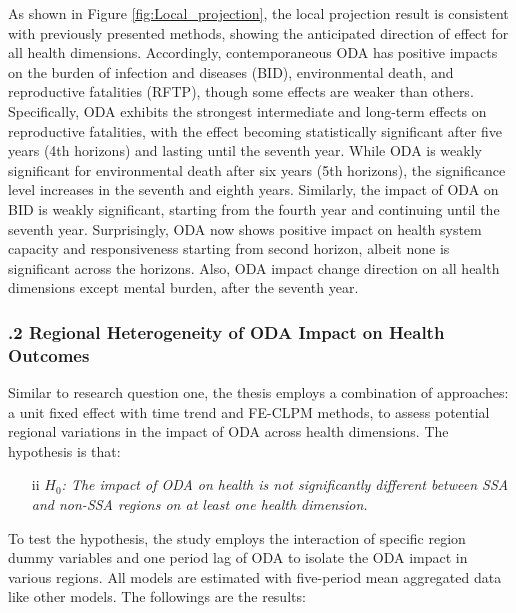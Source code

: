 As shown in Figure \ref{fig:Local_projection}, the local projection result is consistent with previously presented methods, showing the anticipated direction of effect for all health dimensions. Accordingly, contemporaneous ODA has positive impacts on the burden of infection and diseases (BID), environmental death, and reproductive fatalities (RFTP), though some effects are weaker than others. Specifically, ODA exhibits the strongest intermediate and long-term effects on reproductive fatalities, with the effect becoming statistically significant after five years (4th horizons) and lasting until the seventh year. While ODA is weakly significant for environmental death after six years (5th horizons), the significance level increases in the seventh and eighth years. Similarly, the impact of ODA on BID is weakly significant, starting from the fourth year and continuing until the seventh year. Surprisingly, ODA now shows positive impact on health system capacity and responsiveness starting from second horizon, albeit none is significant across the horizons. Also, ODA impact change direction on all health dimensions except mental burden, after the seventh year.    

\subsubsection*{.2 Regional Heterogeneity of ODA Impact on Health Outcomes}
Similar to research question one, the thesis employs a combination of approaches: a unit fixed effect with time trend and FE-CLPM methods, to assess potential regional variations in the impact of ODA across health dimensions. The hypothesis is that:
 \begin{enumerate}[i]
    \item[ii] \textit{$H_0$: The impact of ODA on health is not significantly different between SSA and non-SSA regions on at least one health dimension.}
\end{enumerate} 
To test the hypothesis, the study employs the interaction of specific region dummy variables and one period lag of ODA to isolate the ODA impact in various regions. All models are estimated with five-period mean aggregated data like other models. The followings are the results:
